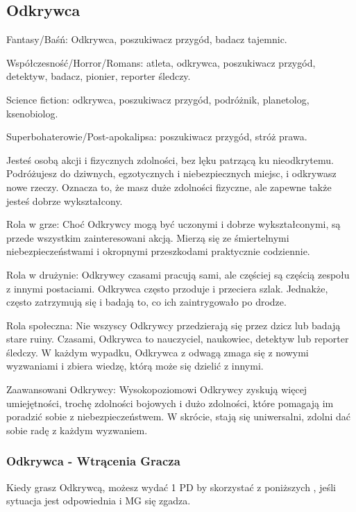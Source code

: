 \cleardoublepage

\subsection{Odkrywca}

Fantasy/Baśń: Odkrywca, poszukiwacz przygód, badacz tajemnic.

Współczesność/Horror/Romans: atleta, odkrywca, poszukiwacz przygód, detektyw, badacz, pionier, reporter śledczy.

Science fiction: odkrywca, poszukiwacz przygód, podróżnik, planetolog, ksenobiolog.

Superbohaterowie/Post-apokalipsa: poszukiwacz przygód, stróż prawa.

Jesteś osobą akcji i fizycznych zdolności, bez lęku patrzącą ku nieodkrytemu. Podróżujesz do dziwnych, egzotycznych i niebezpiecznych miejsc, i odkrywasz nowe rzeczy. Oznacza to, że masz duże zdolności fizyczne, ale zapewne także jesteś dobrze wykształcony. 

Rola w grze: Choć Odkrywcy mogą być uczonymi i dobrze wykształconymi, są przede wszystkim zainteresowani akcją. Mierzą się ze śmiertelnymi niebezpieczeństwami i okropnymi przeszkodami praktycznie codziennie.

Rola w drużynie: Odkrywcy czasami pracują sami, ale częściej są częścią zespołu z innymi postaciami. Odkrywca często przoduje i przeciera szlak. Jednakże, często zatrzymują się i badają to, co ich zaintrygowało po drodze. 

Rola społeczna: Nie wszyscy Odkrywcy przedzierają się przez dzicz lub badają stare ruiny. Czasami, Odkrywca to nauczyciel, naukowiec, detektyw lub reporter śledczy. W każdym wypadku, Odkrywca z odwagą zmaga się z nowymi wyzwaniami i zbiera wiedzę, którą może się dzielić z innymi.

Zaawansowani Odkrywcy: Wysokopoziomowi Odkrywcy zyskują więcej umiejętności, trochę zdolności bojowych i dużo zdolności, które pomagają im poradzić sobie z niebezpieczeństwem. W skrócie, stają się uniwersalni, zdolni dać sobie radę z każdym wyzwaniem. 

\subsubsection{Odkrywca - Wtrącenia Gracza}

Kiedy grasz Odkrywcą, możesz wydać 1 PD by skorzystać z poniższych , jeśli sytuacja jest odpowiednia i MG się zgadza.

